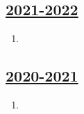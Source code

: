 \subsection[2021-2022]{\hyperref[sec:kr_03_2021_2022]{2021-2022}}
\label{sec:sol_kr_03_2021_2022} %



\begin{enumerate}

\item 


\end{enumerate}
    

\subsection[2020-2021]{\hyperref[sec:kr_03_2020_2021]{2020-2021}}
\label{sec:sol_kr_03_2020_2021} %



\begin{enumerate}
    
    
    
    \item
 
 
\end{enumerate}


